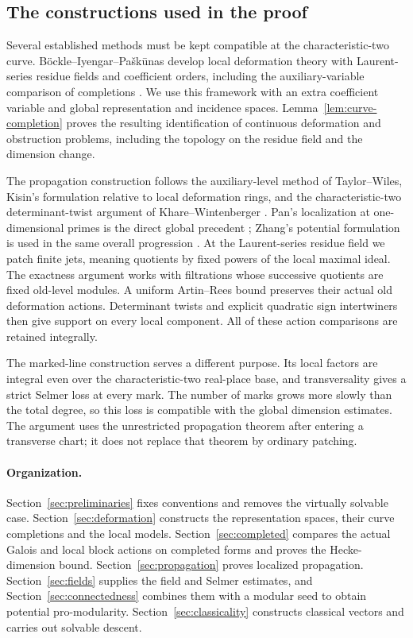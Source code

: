 \subsection{The constructions used in the proof}

Several established methods must be kept compatible at the
characteristic-two curve. B\"ockle--Iyengar--Pa\v{s}k\=unas develop
local deformation theory with Laurent-series residue fields and
coefficient orders, including the auxiliary-variable comparison of
completions \cite[Section~3.5]{BIP}. We use this framework
with an extra coefficient variable and global representation and
incidence spaces. Lemma~\ref{lem:curve-completion} proves the resulting
identification of continuous deformation and obstruction problems,
including the topology on the residue field and the dimension change.

The propagation construction follows the auxiliary-level method of
Taylor--Wiles, Kisin's formulation relative to local deformation rings,
and the characteristic-two determinant-twist argument of
Khare--Wintenberger
\cite{TaylorWiles1995,Kisin2009FiniteFlat,KhareWintenberger2009II}.
Pan's localization at one-dimensional primes is the direct global
precedent \cite{Pan2022}; Zhang's potential formulation is used in
the same overall progression \cite{Zhang2025}. At the Laurent-series
residue field we patch finite jets, meaning quotients by fixed powers
of the local maximal ideal. The exactness argument works with
filtrations whose successive quotients are fixed old-level modules.
A uniform Artin--Rees bound preserves their actual old deformation
actions. Determinant twists and explicit quadratic sign intertwiners
then give support on every local component. All of these action
comparisons are retained integrally.

The marked-line construction serves a different purpose. Its local
factors are integral even over the characteristic-two real-place
base, and transversality gives a strict Selmer loss at every mark.
The number of marks grows more slowly than the total degree, so this
loss is compatible with the global dimension estimates. The argument
uses the unrestricted propagation theorem after entering a transverse
chart; it does not replace that theorem by ordinary patching.

\paragraph{Organization.}
Section~\ref{sec:preliminaries} fixes conventions and removes the
virtually solvable case. Section~\ref{sec:deformation} constructs the
representation spaces, their curve completions and the local models.
Section~\ref{sec:completed} compares the actual Galois and local
block actions on completed forms and proves the Hecke-dimension bound.
Section~\ref{sec:propagation} proves localized propagation.
Section~\ref{sec:fields} supplies the field and Selmer estimates, and
Section~\ref{sec:connectedness} combines them with a modular seed to
obtain potential pro-modularity. Section~\ref{sec:classicality}
constructs classical vectors and carries out solvable descent.
